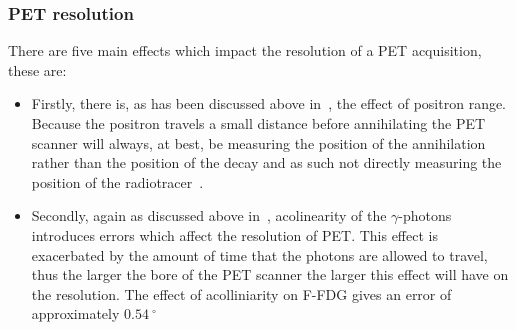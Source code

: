             \subsubsection{PET resolution} \label{sec:pet_resolution}
                There are five main effects which impact the resolution of a \gls{PET} acquisition, these are:
                
                \begin{itemize}
                    \item Firstly, there is, as has been discussed above in~, the effect of positron range. Because the positron travels a small distance before annihilating the \gls{PET} scanner will always, at best, be measuring the position of the annihilation rather than the position of the decay and as such not directly measuring the position of the radiotracer~.

                    \item Secondly, again as discussed above in~, acolinearity of the $\gamma$-photons introduces errors which affect the resolution of \gls{PET}. %
                    This effect is exacerbated by the amount of time that the photons are allowed to travel, thus the larger the bore of the \gls{PET} scanner the larger this effect will have on the resolution. The effect of acolliniarity on \gls{F-FDG} gives an error of approximately $\SI{0.54}{^{\circ}}$~
                    
                    

\end{itemize}
